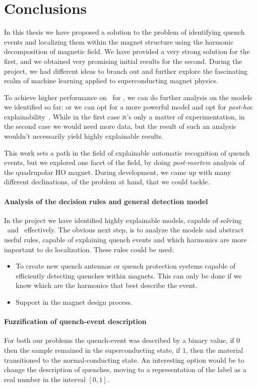 \chapter{Conclusions}
\label{chp:conclusion}
In this thesis we have proposed a solution to the problem of identifying quench events and
localizing them within the magnet structure using the harmonic decomposition of magnetic field. We
have provided a very strong solution for the first, and we obtained very promising initial results
for the second. During the project, we had different ideas to branch out and further explore the
fascinating realm of machine learning applied to superconducting magnet physics.

To achieve higher performance on \dts\ for \qlp, we can do further analysis on the models we
identified so far; or we can opt for a more powerful model and opt for \emph{post-hoc}
explainability~\cite{retzlaff2024}. While in the first case it's only a matter of experimentation,
in the second case we would need more data, but the result of such an analysis wouldn't necessarily
yield highly explainable results.

This work sets a path in the field of explainable automatic recognition of quench events, but we
explored one facet of the field, by doing \emph{post-mortem} analysis of the quadrupolar HO magnet.
During development, we came up with many different declinations, of the problem at hand, that we
could tackle.

\subsubsection{Analysis of the decision rules and general detection model}
In the project we have identified highly explainable models, capable of solving \qrp\ and \qlp\
effectively. The obvious next step, is to analyze the models and abstract useful rules, capable of
explaining quench events and which harmonics are more important to do localization. These rules could be used:
\begin{itemize}
	\item To create new quench antennae or quench protection systems capable of efficiently
	      detecting quenches within magnets. This can only be done if we know which are the
	      harmonics that best describe the event.
	\item Support in the magnet design process.
\end{itemize}

\subsubsection{Fuzzification of quench-event description}
For both our problems the quench-event was described by a binary value, if $0$ then the sample
remained in the superconducting state, if $1$, then the material transitioned to the
normal-conducting state. An interesting option would be to change the description of quenches,
moving to a representation of the label as a real number in the interval $[0, 1]$.


